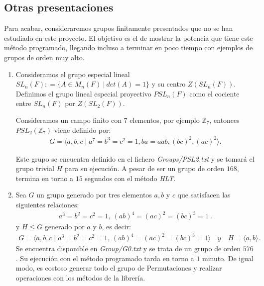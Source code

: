 \newpage
\subsection{Otras presentaciones}
Para acabar, consideraremos grupos finitamente presentados que no se han estudiado en este proyecto. El objetivo es el de mostrar la potencia que tiene este método programado, llegando incluso a terminar en poco tiempo con ejemplos de grupos de orden muy alto.

\begin{enumerate}
\item Consideramos el grupo especial lineal $SL_n(F) \colon = \{ A \in M_n(F) \: | \: det(A)=1 \}$ y su centro $Z(SL_n(F))$. Definimos el grupo lineal especial proyectivo $PSL_n(F)$ como el cociente entre $SL_n(F)$ por $Z(SL_2(F))$.

Consideramos un campo finito con $7$ elementos, por ejemplo $\mathbb{Z}_7$, entonces $PSL_2(\mathbb{Z}_7)$ viene definido por:
\begin{align*}
        G = \langle a,b,c \mid a^7 = b^3 = c^2 = 1, ba=aab, (bc)^2, (ac)^2  \rangle  .
\end{align*}


Este grupo se encuentra definido en el fichero \textit{Groups/PSL2.txt} y se tomará el grupo trivial $H$ para su ejecución. A pesar de ser un grupo de orden $168$, termina en torno a $15$ segundos con el método \textit{HLT}.


        
\item Sea $G$ un grupo generado por tres elementos $a,b$ y $c$ que satisfacen las siguientes relaciones:
\begin{align*} \label{ye1}
    a^3=b^2=c^2=1,\: (ab)^4=(ac)^2=(bc)^3=1 \:.
\end{align*}
y $H \leq G$ generado por $a$ y $b$, es decir:
\begin{align*}
    G = \langle a,b,c \mid a^3=b^2=c^2=1,\: (ab)^4=(ac)^2=(bc)^3=1 \rangle \quad y \quad H=\langle a,b \rangle.
\end{align*}
Se encuentra disponible en \textit{Group/G0.txt} y se trata de un grupo de orden $576$. Su ejecución con el método programado tarda en torno a $1$ minuto. De igual modo, es costoso generar todo el grupo de Permutaciones y realizar operaciones con los métodos de la librería.




\end{enumerate}
